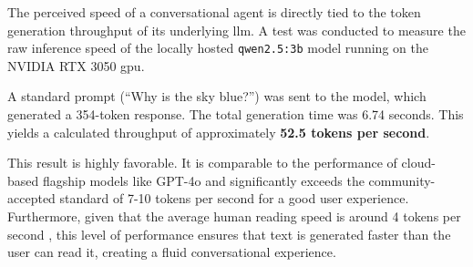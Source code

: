 The perceived speed of a conversational agent is directly tied to the token generation throughput of its underlying \ac{llm}. A test was conducted to measure the raw inference speed of the locally hosted \texttt{qwen2.5:3b} model running on the NVIDIA RTX 3050 \acs{gpu}.

A standard prompt (``Why is the sky blue?'') was sent to the model, which generated a 354-token response. The total generation time was 6.74 seconds. This yields a calculated throughput of approximately \textbf{52.5 tokens per second}.

This result is highly favorable. It is comparable to the performance of cloud-based flagship models like GPT-4o and significantly exceeds the community-accepted standard of 7-10 tokens per second for a good user experience. Furthermore, given that the average human reading speed is around 4 tokens per second \cite{READING-SPEED}, this level of performance ensures that text is generated faster than the user can read it, creating a fluid conversational experience.